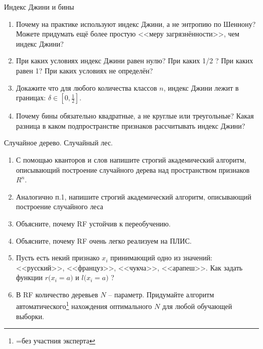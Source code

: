 \begin{frame}{Индекс Джини и бины}
	\begin{enumerate}
	\item Почему на практике используют индекс Джини, а не энтропию по Шеннону? 
	Можете придумать ещё более простую <<меру загрязнённости>>, чем индекс Джини?
	\item При каких условиях индекс Джини равен нулю? При каких 1/2 ? 
	При каких равен 1? При каких условиях не определён?
	\item Докажите что для любого количества классов $n$, индекс Джини лежит в границах: $\delta \in [0, \frac{1}{2}]$.
	\item Почему бины обязательно квадратные, а не круглые или треугольные? Какая разница
	в каком подпространстве признаков рассчитывать индекс Джини? 	
	\end{enumerate}
\end{frame}



\begin{frame}{Случайное дерево. Случайный лес.}
	\begin{enumerate}
	\item С помощью кванторов и слов 
	напишите строгий академический алгоритм,
	описывающий построение случайного дерева 
	над пространством признаков $R^n$.
	\item Аналогично п.1, напишите 
	строгий академический алгоритм,
	описывающий построение случайного леса
	\item Объясните, почему RF устойчив к переобучению.
	\item Объясните, почему RF очень легко реализуем на ПЛИС.
	\item Пусть есть некий признако $x_i$ принимающий одно из значений: 
	<<русский>>, <<француз>>, <<чукча>>, <<арапеш>>. Как задать функции
	$r\big(x_i=a\big)$ и $l\big(x_i=a\big)$ ? 
	\item В RF количество деревьев $N$ -- параметр. 
	Придумайте алгоритм автоматического\footnote{=без участния эксперта} нахождения оптимального $N$
	для любой обучающей выборки.
	\end{enumerate} 
\end{frame} 
  

